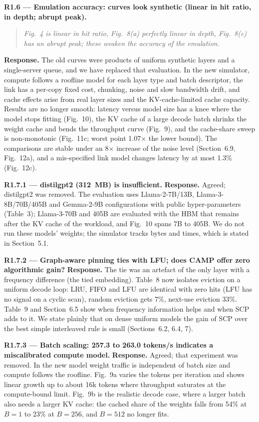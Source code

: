 \documentclass[11pt]{article}
\newcommand{\rc}[1]{\par\medskip\noindent\textbf{#1}}
\newenvironment{comment}{\begin{quote}\itshape}{\end{quote}}
\begin{document}
\rc{R1.6 --- Emulation accuracy: curves look synthetic (linear in hit ratio, in depth; abrupt peak).}
\begin{comment}Fig.~4 is linear in hit ratio, Fig.~8(a) perfectly linear in depth, Fig.~8(c) has an abrupt peak; these weaken the accuracy of the emulation.\end{comment}
\textbf{Response.} The old curves were products of uniform synthetic layers and a single-server queue, and we have replaced that evaluation. In the new simulator, compute follows a roofline model for each layer type and batch descriptor, the link has a per-copy fixed cost, chunking, noise and slow bandwidth drift, and cache effects arise from real layer sizes and the KV-cache-limited cache capacity. Results are no longer smooth: latency versus model size has a knee where the model stops fitting (Fig.~10), the KV cache of a large decode batch shrinks the weight cache and bends the throughput curve (Fig.~9), and the cache-share sweep is non-monotonic (Fig.~11c; worst point 1.07$\times$ the lower bound). The comparisons are stable under an 8$\times$ increase of the noise level (Section~6.9, Fig.~12a), and a mis-specified link model changes latency by at most 1.3\% (Fig.~12c).

\rc{R1.7.1 --- distilgpt2 (312~MB) is insufficient.}
\textbf{Response.} Agreed; distilgpt2 was removed. The evaluation uses Llama-2-7B/13B, Llama-3-8B/70B/405B and Gemma-2-9B configurations with public hyper-parameters (Table~3); Llama-3-70B and 405B are evaluated with the HBM that remains after the KV cache of the workload, and Fig.~10 spans 7B to 405B. We do not run these models' weights; the simulator tracks bytes and times, which is stated in Section~5.1.

\rc{R1.7.2 --- Graph-aware pinning ties with LFU; does CAMP offer zero algorithmic gain?}
\textbf{Response.} The tie was an artefact of the only layer with a frequency difference (the tied embedding). Table~8 now isolates eviction on a uniform decode loop: LRU, FIFO and LFU are identical with zero hits (LFU has no signal on a cyclic scan), random eviction gets 7\%, next-use eviction 33\%. Table~9 and Section~6.5 show when frequency information helps and when SCP adds to it. We state plainly that on dense uniform models the gain of SCP over the best simple interleaved rule is small (Sections~6.2, 6.4, 7).

\rc{R1.7.3 --- Batch scaling: 257.3 to 263.0 tokens/s indicates a miscalibrated compute model.}
\textbf{Response.} Agreed; that experiment was removed. In the new model weight traffic is independent of batch size and compute follows the roofline. Fig.~9a varies the tokens per iteration and shows linear growth up to about 16k tokens where throughput saturates at the compute-bound limit. Fig.~9b is the realistic decode case, where a larger batch also needs a larger KV cache: the cached share of the weights falls from 54\% at $B=1$ to 23\% at $B=256$, and $B=512$ no longer fits.
\end{document}
